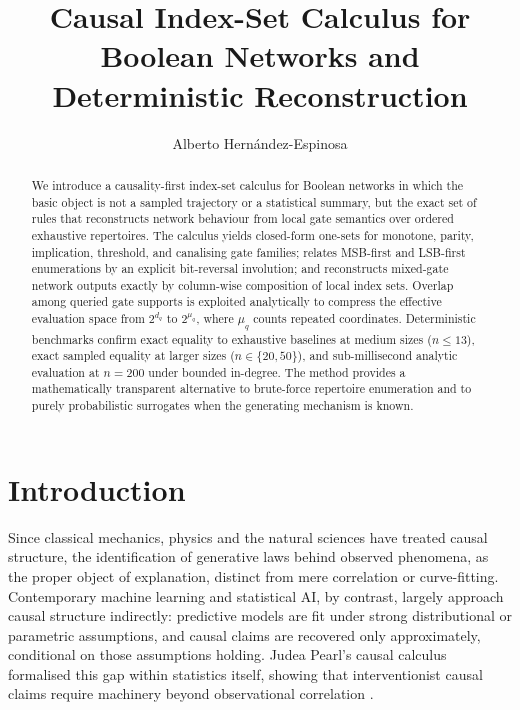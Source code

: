 \documentclass[11pt]{article}
\title{Causal Index-Set Calculus for Boolean Networks and Deterministic Reconstruction}
\author{Alberto Hernández-Espinosa}
\date{}
\theoremstyle{definition}
\begin{document}
\maketitle

\begin{abstract}
We introduce a causality-first index-set calculus for Boolean networks in which the basic
object is not a sampled trajectory or a statistical summary, but the exact set of rules that
reconstructs network behaviour from local gate semantics over ordered exhaustive repertoires.
The calculus yields closed-form one-sets for monotone, parity, implication, threshold, and
canalising gate families; relates MSB-first and LSB-first enumerations by an explicit
bit-reversal involution; and reconstructs mixed-gate network outputs exactly by column-wise
composition of local index sets. Overlap among queried gate supports is exploited analytically
to compress the effective evaluation space from \(2^{d_q}\) to \(2^{\mu_q}\), where \(\mu_q\)
counts repeated coordinates. Deterministic benchmarks confirm exact equality to exhaustive
baselines at medium sizes (\(n\leq 13\)), exact sampled equality at larger sizes
(\(n\in\{20,50\}\)), and sub-millisecond analytic evaluation at \(n=200\) under bounded
in-degree. The method provides a mathematically transparent alternative to brute-force
repertoire enumeration and to purely probabilistic surrogates when the generating mechanism
is known.
\end{abstract}

\section{Introduction}
Since classical mechanics, physics and the natural sciences have
treated causal structure, the identification of generative laws behind observed phenomena, as the
proper object of explanation, distinct from mere correlation or curve-fitting. Contemporary machine
learning and statistical AI, by contrast, largely approach causal structure indirectly: predictive models
are fit under strong distributional or parametric assumptions, and causal claims are recovered only
approximately, conditional on those assumptions holding. Judea Pearl's causal calculus formalised this gap
within statistics itself, showing that interventionist causal claims require machinery beyond
observational correlation \cite{pearl2009causality}.
\end{document}
